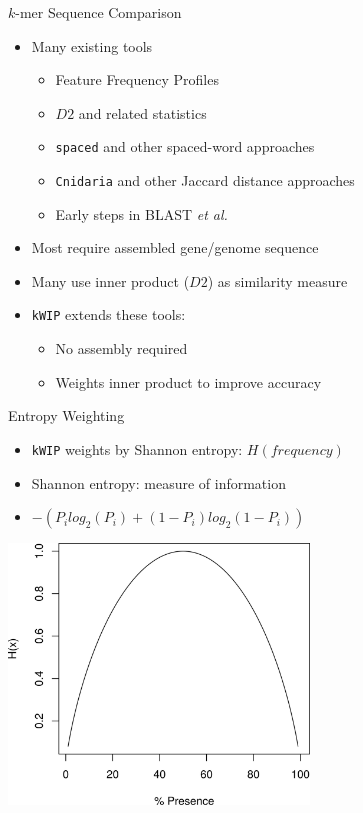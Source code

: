\documentclass[t]{beamer}
\begin{document}
\begin{frame}{$k$-mer Sequence Comparison}
  \begin{itemize}
    \item Many existing tools
    \begin{itemize}
      \item Feature Frequency Profiles \autocite{sims_alignment-free_2009}
      \item $D2$ and related statistics
      \item \texttt{spaced} and other spaced-word approaches
        \autocite{morgenstern_estimating_2015,leimeister_fast_2014}
      \item \texttt{Cnidaria} and other Jaccard distance approaches
        \autocite{aflitos_cnidaria:_2015}
      \item Early steps in BLAST \textit{et al.}
    \end{itemize}
    \item Most require assembled gene/genome sequence
    \item Many use inner product ($D2$) as similarity measure
    \item \texttt{kWIP} extends these tools:
      \begin{itemize}
        \item No assembly required
        \item Weights inner product to improve accuracy
      \end{itemize}
  \end{itemize}
\end{frame}


\begin{frame}{Entropy Weighting}
  \begin{itemize}
    \item \texttt{kWIP} weights by Shannon entropy: $H(frequency)$
    \item Shannon entropy: measure of information
    \item $-(P_i log_2(P_i) + (1-P_i) log_2(1-P_i))$
  \end{itemize}
  \begin{center}
    \includegraphics[width=0.6\textwidth]{img/shanent.png}
  \end{center}
\end{frame}
\end{document}
